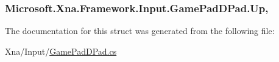 \subsubsection[{Up}]{ Microsoft.\+Xna.\+Framework.\+Input.\+Game\+Pad\+D\+Pad.\+Up\hspace{0.3cm}{\ttfamily [get]}, {\ttfamily [set]}}\label{struct_microsoft_1_1_xna_1_1_framework_1_1_input_1_1_game_pad_d_pad_a8302936eec024021f510a2a633ca3a35}


The documentation for this struct was generated from the following file\+:\begin{DoxyCompactItemize}
\item 
Xna/\+Input/\hyperlink{_game_pad_d_pad_8cs}{Game\+Pad\+D\+Pad.\+cs}\end{DoxyCompactItemize}
